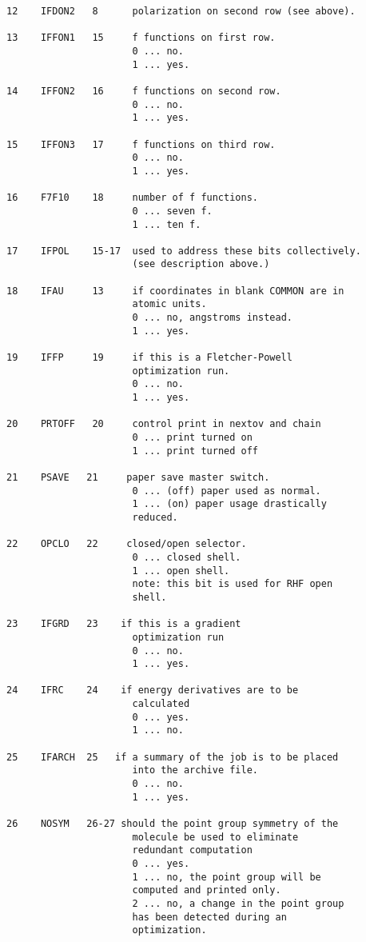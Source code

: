 {\begin{verbatim}
12    IFDON2   8      polarization on second row (see above).

13    IFFON1   15     f functions on first row.
                      0 ... no.
                      1 ... yes.

14    IFFON2   16     f functions on second row.
                      0 ... no.
                      1 ... yes.

15    IFFON3   17     f functions on third row.
                      0 ... no.
                      1 ... yes.

16    F7F10    18     number of f functions.
                      0 ... seven f.
                      1 ... ten f.

17    IFPOL    15-17  used to address these bits collectively.
                      (see description above.)

18    IFAU     13     if coordinates in blank COMMON are in
                      atomic units.
                      0 ... no, angstroms instead.
                      1 ... yes.

19    IFFP     19     if this is a Fletcher-Powell
                      optimization run.
                      0 ... no.
                      1 ... yes.

20    PRTOFF   20     control print in nextov and chain
                      0 ... print turned on
                      1 ... print turned off

21    PSAVE   21     paper save master switch.
                      0 ... (off) paper used as normal.
                      1 ... (on) paper usage drastically
                      reduced.

22    OPCLO   22     closed/open selector.
                      0 ... closed shell.
                      1 ... open shell.
                      note: this bit is used for RHF open
                      shell.

23    IFGRD   23    if this is a gradient
                      optimization run
                      0 ... no.
                      1 ... yes.

24    IFRC    24    if energy derivatives are to be
                      calculated
                      0 ... yes.
                      1 ... no.

25    IFARCH  25   if a summary of the job is to be placed
                      into the archive file.
                      0 ... no.
                      1 ... yes.

26    NOSYM   26-27 should the point group symmetry of the
                      molecule be used to eliminate
                      redundant computation
                      0 ... yes.
                      1 ... no, the point group will be
                      computed and printed only.
                      2 ... no, a change in the point group
                      has been detected during an
                      optimization.
\end{verbatim}
}
\newpage
